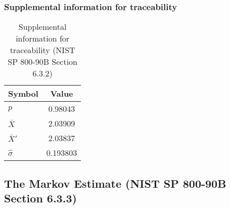 \documentclass[a3paper,xelatex,english]{bxjsarticle}
\begin{document}
\subsubsection{Supplemental information for traceability}
\renewcommand{\arraystretch}{1.8}
\begin{table}[h]
\caption{Supplemental information for traceability (NIST SP 800-90B Section 6.3.2)}
\begin{center}
\begin{tabular}{|l|c|}
\hline 
\rowcolor{anotherlightblue} %
Symbol				& Value \\ \hline 
$p$				&  0.98043\\ \hline 
$\bar{X}$ 		&  2.03909\\ \hline
$\bar{X}'$		&  2.03837\\ \hline
$\hat{\sigma}$		& 0.193803\\ \hline
\end{tabular}
\end{center}
\end{table}
\renewcommand{\arraystretch}{1.4}
\clearpage
\subsection{The Markov Estimate (NIST SP 800-90B Section 6.3.3)}\label{sec:Binary633}
\end{document}
